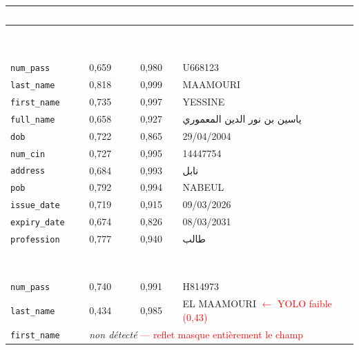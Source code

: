 \renewcommand{\arraystretch}{1.25}
\setlength{\LTleft}{0pt plus 1fill}
\setlength{\LTright}{0pt plus 1fill}
\begin{longtable}{|p{3cm}|p{1.8cm}|p{1.8cm}|p{7.5cm}|}
  \rowcolor{bleu_principal}
  \textcolor{white}{\textbf{Champ}} &
  \textcolor{white}{\textbf{YOLO}} &
  \textcolor{white}{\textbf{OCR}} &
  \textcolor{white}{\textbf{Sortie finale}} \\
  \hline
  \endfirsthead
  \rowcolor{bleu_principal}
  \textcolor{white}{\textbf{Champ}} &
  \textcolor{white}{\textbf{YOLO}} &
  \textcolor{white}{\textbf{OCR}} &
  \textcolor{white}{\textbf{Sortie finale}} \\
  \hline
  \endhead
  \multicolumn{4}{|p{14.2cm}|}{\cellcolor{bleu_principal}\textcolor{white}{\textbf{Passeport bonne qualité (conf. globale : 0,948)}}} \\ \hline
  \texttt{num\_pass}    & 0,659 & 0,980 & U668123 \\ \hline
  \texttt{last\_name}   & 0,818 & 0,999 & MAAMOURI \\ \hline
  \texttt{first\_name}  & 0,735 & 0,997 & YESSINE \\ \hline
  \texttt{full\_name}   & 0,658 & 0,927 & \textarabic{ياسين بن نور الدين المعموري} \\ \hline
  \texttt{dob}          & 0,722 & 0,865 & 29/04/2004 \\ \hline
  \texttt{num\_cin}     & 0,727 & 0,995 & 14447754 \\ \hline
  \texttt{address}      & 0,684 & 0,993 & \textarabic{نابل} \\ \hline
  \texttt{pob}          & 0,792 & 0,994 & NABEUL \\ \hline
  \texttt{issue\_date}  & 0,719 & 0,915 & 09/03/2026 \\ \hline
  \texttt{expiry\_date} & 0,674 & 0,826 & 08/03/2031 \\ \hline
  \texttt{profession}   & 0,777 & 0,940 & \textarabic{طالب} \\ \hline
  \multicolumn{4}{|p{14.2cm}|}{\cellcolor{bleu_principal}\textcolor{white}{\textbf{Passeport reflet (conf. globale : 0,896) --- reflet sur first\_name, dob, expiry\_date, issue\_date}}} \\ \hline
  \texttt{num\_pass}    & 0,740 & 0,991 & H814973 \\ \hline
  \texttt{last\_name}   & 0,434 & 0,985 & EL MAAMOURI \textcolor{red}{\small$\leftarrow$ YOLO faible (0,43)} \\ \hline
  \texttt{first\_name}  & \multicolumn{3}{p{11.1cm}|}{\textit{non détecté} \textcolor{red}{\small--- reflet masque entièrement le champ}} \\ \hline

\end{longtable}

